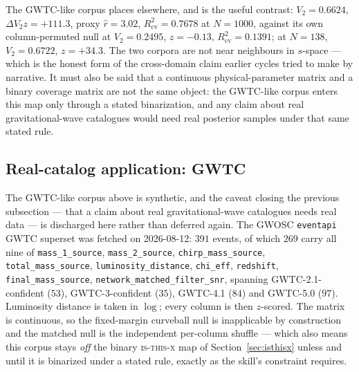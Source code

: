 \documentclass[11pt,a4paper]{article}
\theoremstyle{plain}
\theoremstyle{remark}
\theoremstyle{plain}
\begin{document}
The GWTC-like corpus places elsewhere, and is the useful contrast: $V_2=0.6624$, $\Delta V_2z=+111.3$, proxy $\hat r=3.02$, $R^2_{\mathrm{cv}}=0.7678$ at $N=1000$, against its own column-permuted null at $V_2=0.2495$, $z=-0.13$, $R^2_{\mathrm{cv}}=0.1391$; at $N=138$, $V_2=0.6722$, $z=+34.3$. The two corpora are not near neighbours in $s$-space --- which is the honest form of the cross-domain claim earlier cycles tried to make by narrative. It must also be said that a continuous physical-parameter matrix and a binary coverage matrix are not the same object: the GWTC-like corpus enters this map only through a stated binarization, and any claim about real gravitational-wave catalogues would need real posterior samples under that same stated rule.

\subsection{Real-catalog application: GWTC}
\label{sec:gwtcreal}

The GWTC-like corpus above is synthetic, and the caveat closing the previous subsection --- that a claim about real gravitational-wave catalogues needs real data --- is discharged here rather than deferred again. The GWOSC \texttt{eventapi} GWTC superset was fetched on 2026-08-12: $391$ events, of which $269$ carry all nine of \texttt{mass\_1\_source}, \texttt{mass\_2\_source}, \texttt{chirp\_mass\_source}, \texttt{total\_mass\_source}, \texttt{luminosity\_distance}, \texttt{chi\_eff}, \texttt{redshift}, \texttt{final\_mass\_source}, \texttt{network\_matched\_filter\_snr}, spanning GWTC-2.1-confident ($53$), GWTC-3-confident ($35$), GWTC-4.1 ($84$) and GWTC-5.0 ($97$). Luminosity distance is taken in $\log$; every column is then $z$-scored. The matrix is continuous, so the fixed-margin curveball null is inapplicable by construction and the matched null is the independent per-column shuffle --- which also means this corpus stays \emph{off} the binary \textsc{is-this-x} map of Section~\ref{sec:isthisx} unless and until it is binarized under a stated rule, exactly as the skill's constraint requires.
\end{document}
